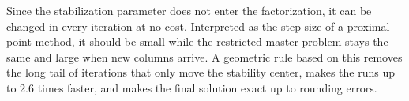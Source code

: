 \documentclass[11pt, openany]{book}
\theoremstyle{definition}
\begin{document}
\medskip

Since the stabilization parameter does not enter the factorization, it can be changed in every
iteration at no cost. Interpreted as the step size of a proximal point method, it should be
small while the restricted master problem stays the same and large when new columns arrive.
A geometric rule based on this removes the long tail of iterations that only move the
stability center, makes the runs up to 2.6 times faster, and makes the final solution exact up
to rounding errors.


\cleardoublepage
\tableofcontents


\mainmatter












\backmatter

\end{document}
